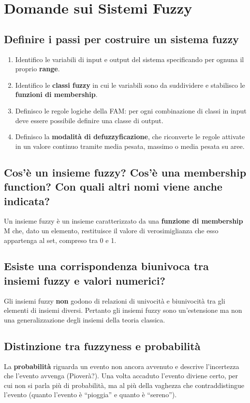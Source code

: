 \documentclass[\main/main.tex]{subfiles}
\begin{document}
\section{Domande sui Sistemi Fuzzy}
\subsection{Definire i passi per costruire un sistema fuzzy}
\begin{enumerate}
	\item Identifico le variabili di input e output del sistema specificando per ognuna il proprio \textbf{range}.
	\item Identifico le \textbf{classi fuzzy} in cui le variabili sono da suddividere e stabilisco le \textbf{funzioni di membership}.
	\item Definisco le regole logiche della FAM: per ogni combinazione di classi in input deve essere possibile definire una classe di output.
	\item Definisco la \textbf{modalità di defuzzyficazione}, che riconverte le regole attivate in un valore continuo tramite media pesata, massimo o media pesata su aree.
\end{enumerate}

\subsection{Cos'è un insieme fuzzy? Cos'è una membership function? Con quali altri nomi viene anche indicata?}
Un insieme fuzzy è un insieme caratterizzato da una \textbf{funzione di membership} M che, dato un elemento, restituisce il valore di verosimiglianza che esso appartenga al set, compreso tra 0 e 1.

\subsection{Esiste una corrispondenza biunivoca tra insiemi fuzzy e valori numerici?}
Gli insiemi fuzzy \textbf{non} godono di relazioni di univocità e biunivocità tra gli elementi di insiemi diversi. Pertanto gli insiemi fuzzy sono un'estensione ma non una generalizzazione degli insiemi della teoria classica.

\subsection{Distinzione tra fuzzyness e probabilità}
La \textbf{probabilità} riguarda un evento non ancora avvenuto e descrive l'incertezza che l'evento avvenga (Pioverà?). Una volta accaduto l'evento diviene certo, per cui non si parla più di probabilità, ma al più della vaghezza che contraddistingue l'evento (quanto l'evento è ``pioggia'' e quanto è ``sereno'').
\end{document}
